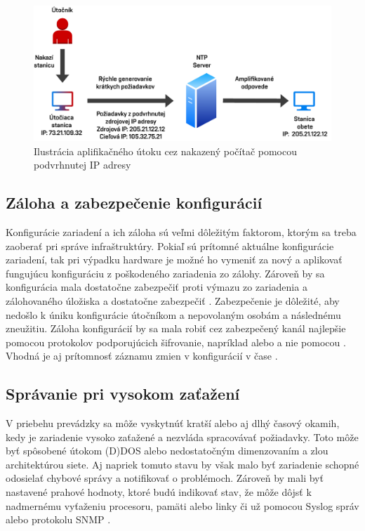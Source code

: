 \begin{figure}[H]
	\begin{center}
		\includegraphics[scale=0.75]{obrazky/ntp_amplification.pdf}
	\end{center}
	\caption[Ilustrácia aplifikačného útoku cez nakazený počítač pomocou podvrhnutej IP adresy]{Ilustrácia aplifikačného útoku cez nakazený počítač pomocou podvrhnutej IP adresy \cite{gTkmbyKon9H6tuAm}}
	\label{fig:ntp-amp}
\end{figure} 

\subsection*{Záloha a zabezpečenie konfigurácií}
Konfigurácie zariadení a ich záloha sú veľmi dôležitým faktorom, ktorým sa treba zaoberať pri správe infraštruktúry. Pokiaľ sú prítomné aktuálne konfigurácie zariadení, tak pri výpadku hardware je možné ho vymeniť za nový a aplikovať fungujúcu konfiguráciu z poškodeného zariadenia zo zálohy. Zároveň by sa konfigurácia mala dostatočne zabezpečiť proti výmazu zo zariadenia a zálohovaného úložiska a dostatočne zabezpečiť \cite{McMillan2018}. Zabezpečenie je dôležité, aby nedošlo k úniku konfigurácie útočníkom a nepovolaným osobám a následnému zneužitiu. Záloha konfigurácií by sa mala robiť cez zabezpečený kanál najlepšie pomocou protokolov podporujúcich šifrovanie, napríklad  alebo  a nie pomocou  \cite{Singh2018}. Vhodná je aj prítomnosť záznamu zmien v konfigurácií v čase \cite{McMillan2018}.

\subsection*{Správanie pri vysokom zaťažení}
V priebehu prevádzky sa môže vyskytnúť kratší alebo aj dlhý časový okamih, kedy je zariadenie vysoko zaťažené a nezvláda spracovávať požiadavky. Toto môže byť spôsobené útokom (D)DOS alebo nedostatočným dimenzovaním a zlou architektúrou siete. Aj napriek tomuto stavu by však malo byť zariadenie schopné odosielať chybové správy a notifikovať o problémoch. Zároveň by mali byť nastavené prahové hodnoty, ktoré budú indikovať stav, že môže dôjsť k nadmernému vyťaženiu procesoru, pamäti alebo linky či už pomocou Syslog správ alebo protokolu SNMP \cite{uYLsMtQInofenpV3} \cite{Singh2018}.

